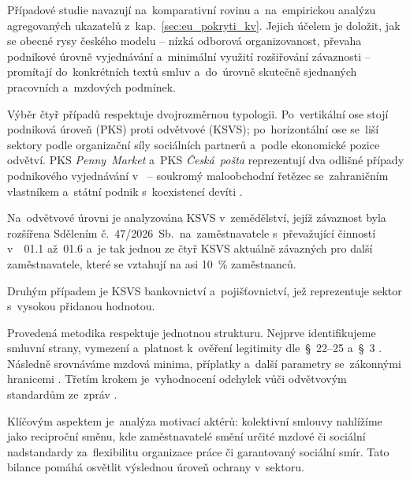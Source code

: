 
Případové studie navazují na~komparativní rovinu a~na~empirickou analýzu agregovaných ukazatelů z~kap.~\ref{sec:eu_pokryti_kv}.
Jejich účelem je doložit, jak se obecné rysy českého modelu  -- nízká odborová organizovanost, převaha podnikové úrovně vyjednávání a~minimální využití rozšiřování závaznosti  -- promítají do~konkrétních textů smluv a~do~úrovně skutečně sjednaných pracovních a~mzdových podmínek.\par

Výběr čtyř případů respektuje dvojrozměrnou typologii.
Po~vertikální ose stojí podniková úroveň (\acs{PKS}) proti odvětvové (\acs{KSVS}); po~horizontální ose se~liší sektory podle organizační síly sociálních partnerů a~podle ekonomické pozice odvětví.
\Acf{PKS} \emph{Penny~Market} a~\acs{PKS} \emph{Česká~pošta} reprezentují dva odlišné případy podnikového vyjednávání v~ -- soukromý maloobchodní řetězec se~zahraničním vlastníkem a~státní podnik s~koexistencí devíti .\par
Na~odvětvové úrovni je analyzována \acf{KSVS} v~zemědělství, jejíž závaznost byla rozšířena Sdělením č.~47/2026~Sb.~na~zaměstnavatele s~převažující činností v~~01.1 až~01.6 a~je tak jednou ze čtyř \acs{KSVS} aktuálně závazných pro další zaměstnavatele, které se vztahují na asi 10~\% zaměstnanců.~\cite{sdeleni_47_2026}\par
Druhým případem je \acs{KSVS} bankovnictví a~pojišťovnictví, jež reprezentuje sektor s~vysokou přidanou hodnotou.\par

Provedená metodika respektuje jednotnou strukturu. Nejprve identifikujeme smluvní strany, vymezení  a~platnost k~ověření legitimity dle~\S~22--25  a~\S~3 . Následně srovnáváme mzdová minima, příplatky a~další parametry se~zákonnými hranicemi . Třetím krokem je~vyhodnocení odchylek vůči odvětvovým standardům ze~zpráv .~\cite{CMKOS_ZpravaKV2025}\par

Klíčovým aspektem je~analýza motivací aktérů: kolektivní smlouvy nahlížíme jako reciproční směnu, kde zaměstnavatelé smění určité mzdové či sociální nadstandardy za~flexibilitu organizace práce či garantovaný sociální smír. Tato bilance pomáhá osvětlit výslednou úroveň ochrany v~sektoru.\par

